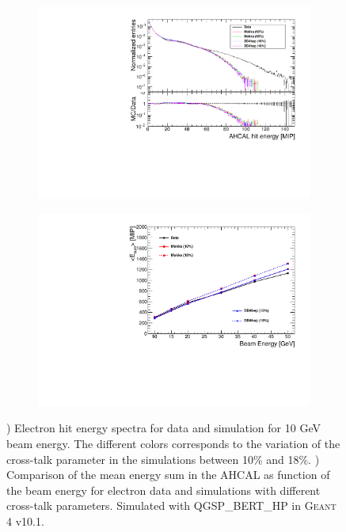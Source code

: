 \documentclass{JINST}
\newcommand\geant{\textsc{Geant\,4}\xspace}
\begin{document}
\begin{figure}[htbp!]
	\centering
	\begin{subfigure}[t]{0.49\textwidth}
		\includegraphics[width=1.\linewidth]{fig/HitEnergy_Electrons10GeV.pdf}
		\caption{} \label{fig:HitEnergy10GeVe}
	\end{subfigure}
	\hfill
	\begin{subfigure}[t]{0.49\textwidth}
		\includegraphics[width=1.\linewidth]{fig/EsumElectrons_BeamEnergy.pdf}
		\caption{} \label{fig:EsumMeanElectron}
	\end{subfigure}
	\caption{) Electron hit energy spectra for data and simulation for 10 GeV beam energy. The different colors corresponds to the variation of the cross-talk parameter in the simulations between 10\% and 18\%. ) Comparison of the mean energy sum in the AHCAL as function of the beam energy for electron data and simulations with different cross-talk parameters. Simulated with QGSP\_BERT\_HP in \geant v10.1.}
	\label{fig:eHitVal}
\end{figure}
\end{document}
